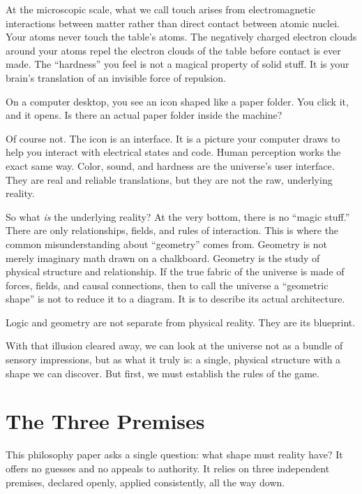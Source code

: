 \documentclass[11pt]{article}
\theoremstyle{canonstyle}
\begin{document}
At the microscopic scale, what we call touch arises from electromagnetic interactions between matter rather than direct contact between atomic nuclei. Your atoms never touch the table's atoms. The negatively charged electron clouds around your atoms repel the electron clouds of the table before contact is ever made. The ``hardness'' you feel is not a magical property of solid stuff. It is your brain's translation of an invisible force of repulsion. 

\begin{reflect}
On a computer desktop, you see an icon shaped like a paper folder. You click it, and it opens. Is there an actual paper folder inside the machine?
\end{reflect}

Of course not. The icon is an interface. It is a picture your computer draws to help you interact with electrical states and code. Human perception works the exact same way. Color, sound, and hardness are the universe's user interface. They are real and reliable translations, but they are not the raw, underlying reality.

So what \emph{is} the underlying reality? At the very bottom, there is no ``magic stuff.'' There are only relationships, fields, and rules of interaction. This is where the common misunderstanding about ``geometry'' comes from. Geometry is not merely imaginary math drawn on a chalkboard. Geometry is the study of physical structure and relationship. If the true fabric of the universe is made of forces, fields, and causal connections, then to call the universe a ``geometric shape'' is not to reduce it to a diagram. It is to describe its actual architecture.

\begin{keyresult}
Logic and geometry are not separate from physical reality. They are its blueprint.
\end{keyresult}

With that illusion cleared away, we can look at the universe not as a bundle of sensory impressions, but as what it truly is: a single, physical structure with a shape we can discover. But first, we must establish the rules of the game.

\newpage

\section{The Three Premises}

This philosophy paper asks a single question: what shape must reality have? It offers no guesses and no appeals to authority. It relies on three independent premises, declared openly, applied consistently, all the way down.
\end{document}
